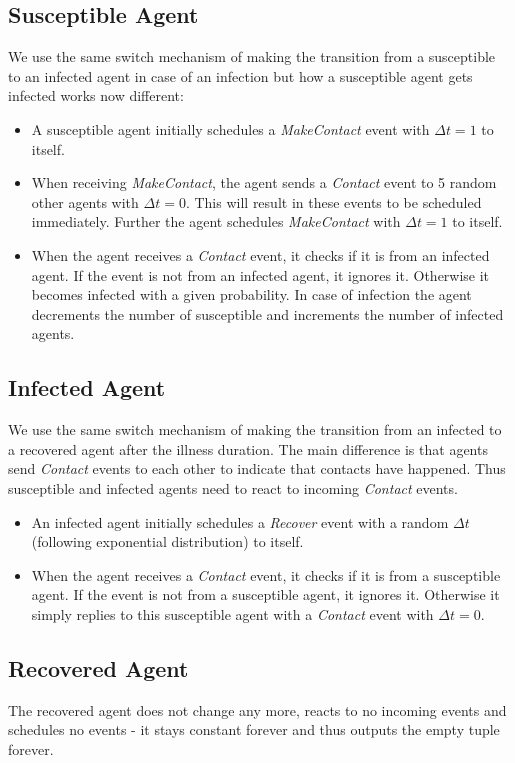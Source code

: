 \subsection{Susceptible Agent}
We use the same switch mechanism of making the transition from a susceptible to an infected agent in case of an infection but how a susceptible agent gets infected works now different:

\begin{itemize}
	\item A susceptible agent initially schedules a \textit{MakeContact} event with $\Delta t = 1$ to itself.
	\item When receiving \textit{MakeContact}, the agent sends a \textit{Contact} event to 5 random other agents with $\Delta t = 0$. This will result in these events to be scheduled immediately. Further the agent schedules \textit{MakeContact} with $\Delta t = 1$ to itself.
	\item When the agent receives a \textit{Contact} event, it checks if it is from an infected agent. If the event is not from an infected agent, it ignores it. Otherwise it becomes infected with a given probability. In case of infection the agent decrements the number of susceptible and increments the number of infected agents.
\end{itemize}

\subsection{Infected Agent}
We use the same switch mechanism of making the transition from an infected to a recovered agent after the illness duration. The main difference is that agents send \textit{Contact} events to each other to indicate that contacts have happened. Thus susceptible and infected agents need to react to incoming \textit{Contact} events.

\begin{itemize}
	\item An infected agent initially schedules a \textit{Recover} event with a random $\Delta t$ (following exponential distribution) to itself.
	\item When the agent receives a \textit{Contact} event, it checks if it is from a susceptible agent. If the event is not from a susceptible agent, it ignores it. Otherwise it simply replies to this susceptible agent with a \textit{Contact} event with $\Delta t = 0$.
\end{itemize}

\subsection{Recovered Agent}
The recovered agent does not change any more, reacts to no incoming events and schedules no events - it stays constant forever and thus outputs the empty tuple forever.

